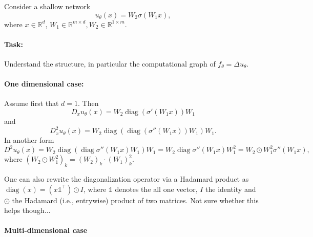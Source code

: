 \documentclass[11pt]{article}
\theoremstyle{definition}
\theoremstyle{plain}
\begin{document}
Consider a shallow network
\[ u_\theta(x) = W_2\sigma(W_1 x), \]
where $x\in\mathbb R^d$, $W_1\in\mathbb R^{m\times d}, W_2\in\mathbb R^{1\times m}$.

\paragraph{Task: }
Understand the structure, in particular the computational graph of $f_\theta = \Delta u_\theta$.

\paragraph{One dimensional case: }
Assume first that $d=1$.
Then
\[ D_x u_\theta(x) = W_2 \operatorname{diag}(\sigma'(W_1 x)) W_1 \]
and
\[ D^2_x u_\theta(x) = W_2%
  \operatorname{diag}(\operatorname{diag}(\sigma''(W_1 x)) W_1)W_1. %
\]
In another form
\[D^2 u_\theta(x) = W_2 \operatorname{diag}(\operatorname{diag}\sigma''(W_1 x) W_1) W_1 = W_2 \operatorname{diag}\sigma''(W_1 x) W_1^2 = W_2\odot W_1^2 \sigma''(W_1x),
\]
where $(W_2\odot W_1^2)_k = (W_2)_k \cdot (W_1)_k^2$.

One can also rewrite the diagonalization operator via a Hadamard product as $\operatorname{diag}(x) = (x\mathds{1}^\top)\odot I$, where $\mathds{1}$ denotes the all one vector, $I$ the identity and $\odot$ the Hadamard (i.e., entrywise) product of two matrices.
Not sure whether this helps though...

\paragraph{Multi-dimensional case}





\end{document}
